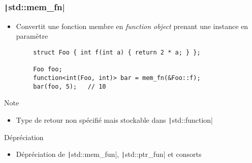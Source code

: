\documentclass[C++.tex]{subfiles}
\begin{document}
\begin{frame}[fragile]
	\frametitle{\texttt|std::mem_fn|}
	\begin{itemize}
		\item Convertit une fonction membre en \textit{function object} prenant une instance en paramètre
	\end{itemize}

	\begin{verbatim}
		struct Foo { int f(int a) { return 2 * a; } };

		Foo foo;
		function<int(Foo, int)> bar = mem_fn(&Foo::f);
		bar(foo, 5);   // 10
	\end{verbatim}

	\begin{block}{Note}
		\begin{itemize}
			\item Type de retour non spécifié mais stockable dans \texttt|std::function|
		\end{itemize}
	\end{block}

	\begin{block}{Dépréciation}
		\begin{itemize}
			\item Dépréciation de \texttt|std::mem_fun|, \texttt|std::ptr_fun| et consorts
		\end{itemize}

	\end{block}
\end{frame}
\end{document}
